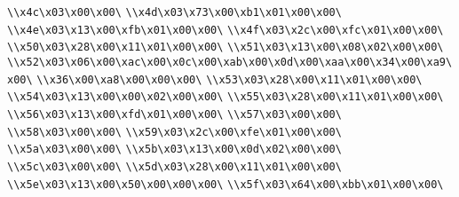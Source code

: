 \verb|\\x4c\x03\x00\x00\|\newline
\verb|\\x4d\x03\x73\x00\xb1\x01\x00\x00\|\newline
\verb|\\x4e\x03\x13\x00\xfb\x01\x00\x00\|\newline
\verb|\\x4f\x03\x2c\x00\xfc\x01\x00\x00\|\newline
\verb|\\x50\x03\x28\x00\x11\x01\x00\x00\|\newline
\verb|\\x51\x03\x13\x00\x08\x02\x00\x00\|\newline
\verb|\\x52\x03\x06\x00\xac\x00\x0c\x00\xab\x00\x0d\x00\xaa\x00\x34\x00\xa9\x00\|\newline
\verb|\\x36\x00\xa8\x00\x00\x00\|\newline
\verb|\\x53\x03\x28\x00\x11\x01\x00\x00\|\newline
\verb|\\x54\x03\x13\x00\x00\x02\x00\x00\|\newline
\verb|\\x55\x03\x28\x00\x11\x01\x00\x00\|\newline
\verb|\\x56\x03\x13\x00\xfd\x01\x00\x00\|\newline
\verb|\\x57\x03\x00\x00\|\newline
\verb|\\x58\x03\x00\x00\|\newline
\verb|\\x59\x03\x2c\x00\xfe\x01\x00\x00\|\newline
\verb|\\x5a\x03\x00\x00\|\newline
\verb|\\x5b\x03\x13\x00\x0d\x02\x00\x00\|\newline
\verb|\\x5c\x03\x00\x00\|\newline
\verb|\\x5d\x03\x28\x00\x11\x01\x00\x00\|\newline
\verb|\\x5e\x03\x13\x00\x50\x00\x00\x00\|\newline
\verb|\\x5f\x03\x64\x00\xbb\x01\x00\x00\|\newline
